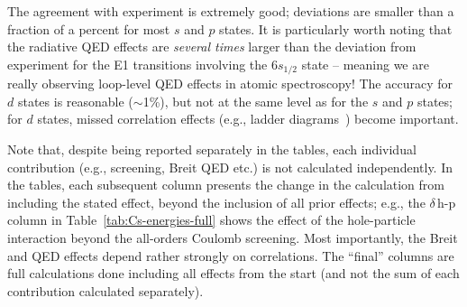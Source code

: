 \documentclass[10pt,twocolumn,a4paper]{article}%
\begin{document}
The agreement with experiment is extremely good; deviations are smaller than a fraction of a percent for most $s$ and $p$ states.
It is particularly worth noting that the radiative QED effects are {\em several times} larger than the deviation from experiment for the E1 transitions involving the $6s_{1/2}$ state -- meaning we are really observing loop-level QED effects in atomic spectroscopy!
The accuracy for $d$ states is reasonable ($\sim$1\%), but not at the same level as for the $s$ and $p$ states; for $d$ states, missed correlation effects (e.g., ladder diagrams~\cite{DzubaLadder2008}) become important.

Note that, despite being reported separately in the tables, each individual contribution (e.g., screening, Breit QED etc.) is not calculated independently.
In the tables, each subsequent column presents the change in the calculation from including the stated effect, beyond the inclusion of all prior effects;
e.g., the $\delta$\,h-p column in Table~\ref{tab:Cs-energies-full} shows the effect of the hole-particle interaction beyond the all-orders Coulomb screening.
Most importantly, the Breit and QED effects depend rather strongly on correlations.
The ``final'' columns are full calculations done including all effects from the start (and not the sum of each contribution calculated separately).
\end{document}
